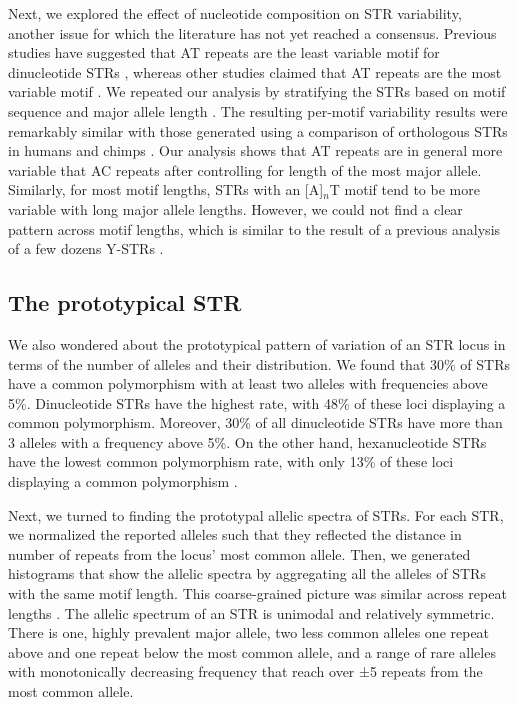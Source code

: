 Next, we explored the effect of nucleotide composition on STR variability, another issue for which the literature has not yet reached a consensus. Previous studies have suggested that AT repeats are the least variable motif for dinucleotide STRs \cite{PembertonSandefurJakobssonEtAl2009,BachtrogAgisImhofEtAl2000}, whereas other studies claimed that AT repeats are the most variable motif \cite{SunHelgasonMassonEtAl2012,KelkarTyekuchevaChiaromonteEtAl2008}. We repeated our analysis by stratifying the STRs based on motif sequence and major allele length \cite{SuppWillemsGymrekHighnamEtAl2014}. The resulting per-motif variability results were remarkably similar with those generated using a comparison of orthologous STRs in humans and chimps \cite{KelkarTyekuchevaChiaromonteEtAl2008}. Our analysis shows that AT repeats are in general more variable that AC repeats after controlling for length of the most major allele. Similarly, for most motif lengths, STRs with an [A]$_n$T motif tend to be more variable with long major allele lengths. However, we could not find a clear pattern across motif lengths, which is similar to the result of a previous analysis of a few dozens Y-STRs \cite{BallantyneGoedbloedFangEtAl2010}. 

\subsection{The prototypical STR}
We also wondered about the prototypical pattern of variation of an STR locus in terms of the number of alleles and their distribution. We found that 30\% of STRs have a common polymorphism with at least two alleles with frequencies above 5\%. Dinucleotide STRs have the highest rate, with 48\% of these loci displaying a common polymorphism. Moreover, 30\% of all dinucleotide STRs have more than 3 alleles with a frequency above 5\%. On the other hand, hexanucleotide STRs have the lowest common polymorphism rate, with only 13\% of these loci displaying a common polymorphism \cite{SuppWillemsGymrekHighnamEtAl2014}.  

Next, we turned to finding the prototypal allelic spectra of STRs. For each STR, we normalized the reported alleles such that they reflected the distance in number of repeats from the locus' most common allele. Then, we generated histograms that show the allelic spectra by aggregating all the alleles of STRs with the same motif length. This coarse-grained picture was similar across repeat lengths \cite{SuppWillemsGymrekHighnamEtAl2014}.  The allelic spectrum of an STR is unimodal and relatively symmetric. There is one, highly prevalent major allele, two less common alleles one repeat above and one repeat below the most common allele, and a range of rare alleles with monotonically decreasing frequency that reach over ±5 repeats from the most common allele.  

